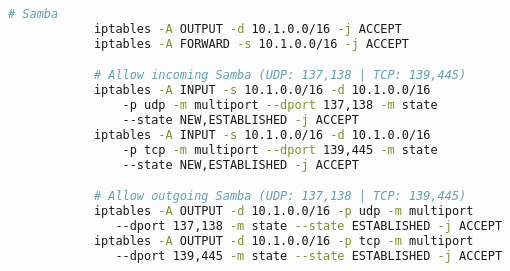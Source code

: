 \begin{itemize}
\begin{lstlisting}[language=bash]
            # Samba
            iptables -A OUTPUT -d 10.1.0.0/16 -j ACCEPT
            iptables -A FORWARD -s 10.1.0.0/16 -j ACCEPT

            # Allow incoming Samba (UDP: 137,138 | TCP: 139,445)
            iptables -A INPUT -s 10.1.0.0/16 -d 10.1.0.0/16
                -p udp -m multiport --dport 137,138 -m state
                --state NEW,ESTABLISHED -j ACCEPT
            iptables -A INPUT -s 10.1.0.0/16 -d 10.1.0.0/16
                -p tcp -m multiport --dport 139,445 -m state
                --state NEW,ESTABLISHED -j ACCEPT

            # Allow outgoing Samba (UDP: 137,138 | TCP: 139,445)
            iptables -A OUTPUT -d 10.1.0.0/16 -p udp -m multiport
               --dport 137,138 -m state --state ESTABLISHED -j ACCEPT
            iptables -A OUTPUT -d 10.1.0.0/16 -p tcp -m multiport
               --dport 139,445 -m state --state ESTABLISHED -j ACCEPT
        \end{lstlisting}

\end{itemize}

